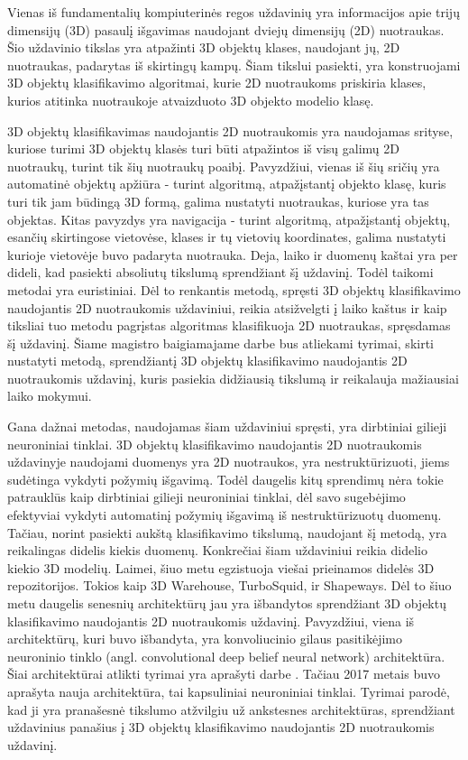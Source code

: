 
Vienas iš fundamentalių kompiuterinės regos uždavinių yra informacijos apie trijų dimensijų (3D) pasaulį išgavimas naudojant dviejų dimensijų (2D) nuotraukas. Šio uždavinio tikslas yra atpažinti 3D objektų klases, naudojant jų, 2D nuotraukas, padarytas iš skirtingų kampų. Šiam tikslui pasiekti, yra konstruojami 3D objektų klasifikavimo algoritmai, kurie 2D nuotraukoms priskiria klases, kurios atitinka nuotraukoje atvaizduoto 3D objekto modelio klasę.

3D objektų klasifikavimas naudojantis 2D nuotraukomis yra naudojamas srityse, kuriose turimi 3D objektų klasės turi būti atpažintos iš visų galimų 2D nuotraukų, turint tik šių nuotraukų poaibį. Pavyzdžiui, vienas iš šių sričių yra automatinė objektų apžiūra - turint algoritmą, atpažįstantį objekto klasę, kuris turi tik jam būdingą 3D formą, galima nustatyti nuotraukas, kuriose yra tas objektas. Kitas pavyzdys yra navigacija - turint algoritmą, atpažįstantį objektų, esančių skirtingose vietovėse, klases ir tų vietovių koordinates, galima nustatyti kurioje vietovėje buvo padaryta nuotrauka. Deja, laiko ir duomenų kaštai yra per dideli, kad pasiekti absoliutų tikslumą sprendžiant šį uždavinį. Todėl taikomi metodai yra euristiniai. Dėl to renkantis metodą, spręsti 3D objektų klasifikavimo naudojantis 2D nuotraukomis uždaviniui, reikia atsižvelgti į laiko kaštus ir kaip tiksliai tuo metodu pagrįstas algoritmas klasifikuoja 2D nuotraukas, spręsdamas šį uždavinį. Šiame magistro baigiamajame darbe bus atliekami tyrimai, skirti nustatyti metodą, sprendžiantį 3D objektų klasifikavimo naudojantis 2D nuotraukomis uždavinį, kuris pasiekia didžiausią tikslumą ir reikalauja mažiausiai laiko mokymui.

Gana dažnai metodas, naudojamas šiam uždaviniui spręsti, yra dirbtiniai gilieji neuroniniai tinklai. 3D objektų klasifikavimo naudojantis 2D nuotraukomis uždavinyje naudojami duomenys yra 2D nuotraukos, yra nestruktūrizuoti, jiems sudėtinga vykdyti požymių išgavimą. Todėl daugelis kitų sprendimų nėra tokie patrauklūs kaip dirbtiniai gilieji neuroniniai tinklai, dėl savo sugebėjimo efektyviai vykdyti automatinį požymių išgavimą iš nestruktūrizuotų duomenų. Tačiau, norint pasiekti aukštą klasifikavimo tikslumą, naudojant šį metodą, yra reikalingas didelis kiekis duomenų. Konkrečiai šiam uždaviniui reikia didelio kiekio 3D modelių. Laimei, šiuo metu egzistuoja viešai prieinamos didelės 3D repozitorijos. Tokios kaip 3D Warehouse, TurboSquid, ir Shapeways. Dėl to šiuo metu daugelis senesnių architektūrų jau yra išbandytos sprendžiant 3D objektų klasifikavimo naudojantis 2D nuotraukomis uždavinį. Pavyzdžiui, viena iš architektūrų, kuri buvo išbandyta, yra konvoliucinio gilaus pasitikėjimo neuroninio tinklo (angl. convolutional deep belief neural network) architektūra. Šiai architektūrai atlikti tyrimai yra aprašyti darbe \cite{dbnExp}. Tačiau 2017 metais buvo aprašyta nauja architektūra, tai kapsuliniai neuroniniai tinklai. Tyrimai parodė, kad ji yra pranašesnė tikslumo atžvilgiu už ankstesnes architektūras, sprendžiant uždavinius panašius į 3D objektų klasifikavimo naudojantis 2D nuotraukomis uždavinį.

